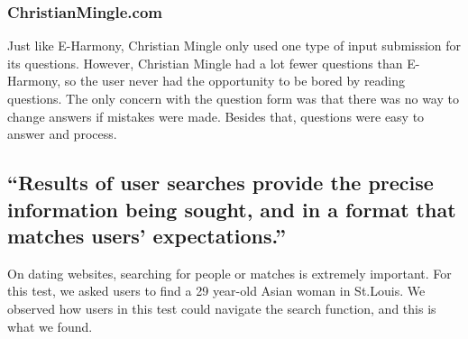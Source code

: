 \documentclass{article}
\begin{document}
\subsubsection{ChristianMingle.com}
Just like E-Harmony, Christian Mingle only used one type of input submission for its questions. However, Christian Mingle had a lot fewer questions than E-Harmony, so the user never had the opportunity to be bored by reading questions. The only concern with the question form was that there was no way to change answers if mistakes were made. Besides that, questions were easy to answer and process.



\subsection{“Results of user searches provide the precise information being sought, and in a format that matches users’ expectations.”}
On dating websites, searching for people or matches is extremely important. For this test, we asked users to find a 29 year-old Asian woman in St.Louis. We observed how users in this test could navigate the search function, and this is what we found.
\end{document}
